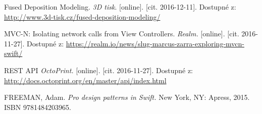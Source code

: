 \documentclass[czech]{article}
\begin{document}
\begin{thebibliography}{}

  Fused Deposition Modeling. \emph{3D tisk}. [online]. [cit. 2016-12-11]. Dostupné z: \url{http://www.3d-tisk.cz/fused-deposition-modeling/}

  MVC-N: Isolating network calls from View Controllers. \emph{Realm.} [online]. [cit. 2016-11-27]. Dostupné z: \url{https://realm.io/news/slug-marcus-zarra-exploring-mvcn-swift/}

  REST API \emph{OctoPrint.} [online]. [cit. 2016-11-27]. Dostupné z: \url{http://docs.octoprint.org/en/master/api/index.html}

  FREEMAN, Adam. \textit{Pro design patterns in Swift.} New York, NY: Apress, 2015. ISBN 9781484203965.

\end{thebibliography}

\newpage
\end{document}
